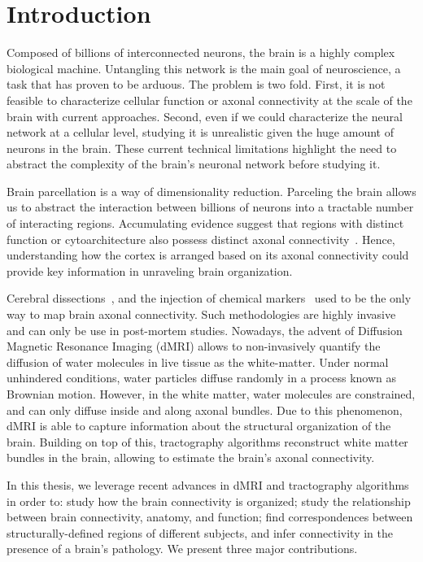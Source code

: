 \chapter{Introduction}

Composed of billions of interconnected neurons, the brain is a highly complex
biological machine. Untangling this network is the main goal of neuroscience,
a task that has proven to be arduous. The problem is two fold. First, it is
not feasible to characterize cellular function or axonal connectivity at the
scale of the brain with current approaches. Second, even if we could characterize
the neural network at a cellular level, studying it is unrealistic given the
huge amount of neurons in the brain.
These current technical limitations highlight the need to abstract the complexity
of the brain's neuronal network before studying it.

Brain parcellation is a way of dimensionality reduction. Parceling the brain
allows us to abstract the interaction between billions of neurons into a tractable
number of interacting regions. Accumulating evidence suggest that regions with
distinct function or cytoarchitecture also possess distinct axonal connectivity~\citep{Passingham2002, Johansen-Berg2004, Honey2009, Eickhoff2010}.
Hence, understanding how the cortex is arranged based on its axonal connectivity
could provide key information in unraveling brain organization. 


Cerebral dissections~\cite{Meynert1872, Brodmann1909, Gray1918},
and the injection of chemical markers~\cite{Schmahmann2006, Stephan2013} used to
be the only way to map brain axonal connectivity. Such methodologies are highly
invasive and can only be use in post-mortem studies. Nowadays, the advent of
Diffusion Magnetic Resonance Imaging (dMRI) allows to non-invasively quantify
the diffusion of water molecules in live tissue as the white-matter. Under
normal unhindered conditions, water particles diffuse randomly in a process
known as Brownian motion. However, in the white matter, water molecules are
constrained, and can only diffuse inside and along axonal bundles. Due to this
phenomenon, dMRI is able to capture information about the structural organization
of the brain. Building on top of this, tractography algorithms reconstruct
white matter bundles in the brain, allowing to estimate the brain's axonal
connectivity.

In this thesis, we leverage recent advances in dMRI and tractography algorithms
in order to: study how the brain connectivity is organized; study the relationship
between brain connectivity, anatomy, and function; find correspondences between 
structurally-defined regions of different subjects, and infer connectivity in
the presence of a brain’s pathology. We present three major contributions.

